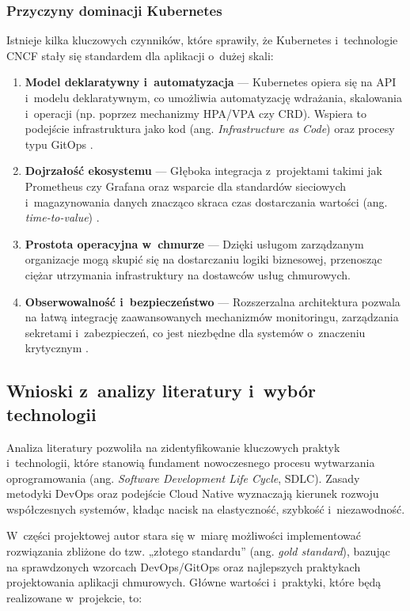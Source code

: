 \subsubsection{Przyczyny dominacji Kubernetes}
Istnieje kilka kluczowych czynników, które sprawiły, że Kubernetes i~technologie CNCF stały się standardem dla aplikacji o~dużej skali:
\begin{enumerate}
    \item \textbf{Model deklaratywny i~automatyzacja} --- Kubernetes opiera się na API i~modelu deklaratywnym, co umożliwia automatyzację wdrażania, skalowania i~operacji (np. poprzez mechanizmy HPA/VPA czy CRD). Wspiera to podejście infrastruktura jako kod (ang. \textit{Infrastructure as Code}) oraz procesy typu GitOps \cite{Mondal2023KubernetesAutoscaling, Oyekunle2024CloudNativeReview}.
    \item \textbf{Dojrzałość ekosystemu} --- Głęboka integracja z~projektami takimi jak Prometheus czy Grafana oraz wsparcie dla standardów sieciowych i~magazynowania danych znacząco skraca czas dostarczania wartości (ang. \textit{time-to-value}) \cite{Alonso2023MultiCloudNative}.
    \item \textbf{Prostota operacyjna w~chmurze} --- Dzięki usługom zarządzanym organizacje mogą skupić się na dostarczaniu logiki biznesowej, przenosząc ciężar utrzymania infrastruktury na dostawców usług chmurowych.
    \item \textbf{Obserwowalność i~bezpieczeństwo} --- Rozszerzalna architektura pozwala na łatwą integrację zaawansowanych mechanizmów monitoringu, zarządzania sekretami i~zabezpieczeń, co jest niezbędne dla systemów o~znaczeniu krytycznym \cite{Oyekunle2024CloudNativeReview, Kosinska2023Observability}.
\end{enumerate}

\subsection{Wnioski z~analizy literatury i~wybór technologii}

Analiza literatury pozwoliła na zidentyfikowanie kluczowych praktyk i~technologii, które stanowią fundament nowoczesnego procesu wytwarzania oprogramowania (ang. \textit{Software Development Life Cycle}, SDLC). Zasady metodyki DevOps oraz podejście Cloud Native wyznaczają kierunek rozwoju współczesnych systemów, kładąc nacisk na elastyczność, szybkość i~niezawodność.

W~części projektowej autor stara się w~miarę możliwości implementować rozwiązania zbliżone do tzw. „złotego standardu” (ang. \textit{gold standard}), bazując na sprawdzonych wzorcach DevOps/GitOps oraz najlepszych praktykach projektowania aplikacji chmurowych. Główne wartości i~praktyki, które będą realizowane w~projekcie, to:

